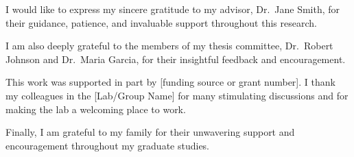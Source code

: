 I would like to express my sincere gratitude to my advisor, Dr.~Jane Smith,
for their guidance, patience, and invaluable support throughout this research.

I am also deeply grateful to the members of my thesis committee,
Dr.~Robert Johnson and Dr.~Maria Garcia, for their insightful feedback
and encouragement.

This work was supported in part by [funding source or grant number].
I thank my colleagues in the [Lab/Group Name] for many stimulating
discussions and for making the lab a welcoming place to work.

Finally, I am grateful to my family for their unwavering support
and encouragement throughout my graduate studies.
